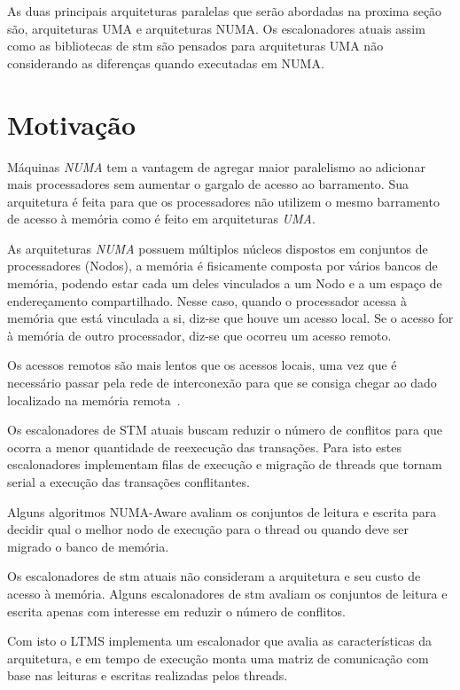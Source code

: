 \documentclass[diss,capa]{texufpel}
\begin{document}
As duas principais arquiteturas paralelas que serão abordadas na proxima seção são, arquiteturas UMA e arquiteturas NUMA. Os escalonadores atuais assim como as bibliotecas de stm são pensados para arquiteturas UMA não considerando as diferenças quando executadas em NUMA.

\section{\textbf{Motivação}}

Máquinas \emph{NUMA} tem a vantagem de agregar maior paralelismo ao adicionar mais processadores sem aumentar o gargalo de acesso ao barramento. Sua arquitetura é feita para que os processadores não utilizem o mesmo barramento de acesso à memória como é feito em arquiteturas \emph{UMA}.

As arquiteturas \emph{NUMA} possuem múltiplos núcleos dispostos em conjuntos de processadores (Nodos), a memória é fisicamente composta por vários bancos de memória, podendo estar cada um deles vinculados a um Nodo e a um espaço de endereçamento compartilhado. Nesse caso, quando o processador acessa à memória que está vinculada a si, diz-se que houve um acesso local. Se o acesso for à memória de outro processador, diz-se que ocorreu um acesso remoto.

Os acessos remotos são mais lentos que os acessos locais, uma vez que é necessário passar pela rede de interconexão para que se consiga chegar ao dado localizado na memória remota~\cite{Rodolfo:2014}.

Os escalonadores de STM atuais buscam reduzir o número de conflitos para que ocorra a menor quantidade de reexecução das transações. Para isto estes escalonadores implementam filas de execução e migração de threads que tornam serial a execução das transações conflitantes.

Alguns algoritmos NUMA-Aware avaliam os conjuntos de leitura e escrita para decidir qual o melhor nodo de execução para o thread ou quando deve ser migrado o banco de memória.

Os escalonadores de stm atuais não consideram a arquitetura e seu custo de acesso à memória. Alguns escalonadores de stm avaliam os conjuntos de leitura e escrita apenas com interesse em reduzir o número de conflitos.

Com isto o LTMS implementa um escalonador que avalia as características da arquitetura, e em tempo de execução monta uma matriz de comunicação com base nas leituras e escritas realizadas pelos threads.
\end{document}
